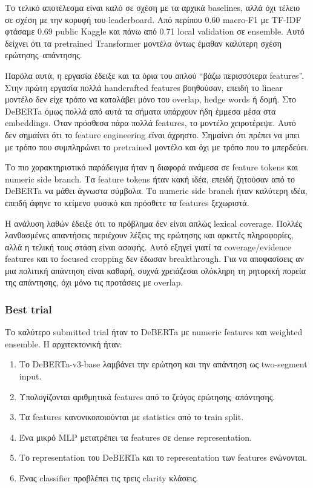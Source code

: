 \documentclass[12pt]{fphw}
\begin{document}
Το τελικό αποτέλεσμα είναι καλό σε σχέση με τα αρχικά baselines, αλλά όχι τέλειο σε σχέση με την κορυφή του leaderboard. Από περίπου 0.60 macro-F1 με TF-IDF φτάσαμε 0.69 public Kaggle και πάνω από 0.71 local validation σε ensemble. Αυτό δείχνει ότι τα pretrained Transformer μοντέλα όντως έμαθαν καλύτερη σχέση ερώτησης--απάντησης.

Παρόλα αυτά, η εργασία έδειξε και τα όρια του απλού ``βάζω περισσότερα features''. Στην πρώτη εργασία πολλά handcrafted features βοηθούσαν, επειδή το linear μοντέλο δεν είχε τρόπο να καταλάβει μόνο του overlap, hedge words ή δομή. Στο DeBERTa όμως πολλά από αυτά τα σήματα υπάρχουν ήδη έμμεσα μέσα στα embeddings. Όταν πρόσθεσα πάρα πολλά features, το μοντέλο χειροτέρεψε. Αυτό δεν σημαίνει ότι το feature engineering είναι άχρηστο. Σημαίνει ότι πρέπει να μπει με τρόπο που συμπληρώνει το pretrained μοντέλο και όχι με τρόπο που το μπερδεύει.

Το πιο χαρακτηριστικό παράδειγμα ήταν η διαφορά ανάμεσα σε feature tokens και numeric side branch. Τα feature tokens ήταν κακή ιδέα, επειδή ζητούσαν από το DeBERTa να μάθει άγνωστα σύμβολα. Το numeric side branch ήταν καλύτερη ιδέα, επειδή άφηνε το κείμενο φυσικό και πρόσθετε τα features ξεχωριστά.

Η ανάλυση λαθών έδειξε ότι το πρόβλημα δεν είναι απλώς lexical coverage. Πολλές λανθασμένες απαντήσεις περιέχουν λέξεις της ερώτησης και αρκετές πληροφορίες, αλλά η τελική τους στάση είναι ασαφής. Αυτό εξηγεί γιατί τα coverage/evidence features και το focused cropping δεν έδωσαν breakthrough. Για να αποφασίσεις αν μια πολιτική απάντηση είναι καθαρή, συχνά χρειάζεσαι ολόκληρη τη ρητορική πορεία της απάντησης, όχι μόνο τις προτάσεις με overlap.

\subsubsection{Best trial}

Το καλύτερο submitted trial ήταν το DeBERTa με numeric features και weighted ensemble. Η αρχιτεκτονική ήταν:

\begin{enumerate}
    \item Το DeBERTa-v3-base λαμβάνει την ερώτηση και την απάντηση ως two-segment input.
    \item Υπολογίζονται αριθμητικά features από το ζεύγος ερώτησης--απάντησης.
    \item Τα features κανονικοποιούνται με statistics από το train split.
    \item Ένα μικρό MLP μετατρέπει τα features σε dense representation.
    \item Το representation του DeBERTa και το representation των features ενώνονται.
    \item Ένας classifier προβλέπει τις τρεις clarity κλάσεις.
\end{enumerate}
\end{document}
